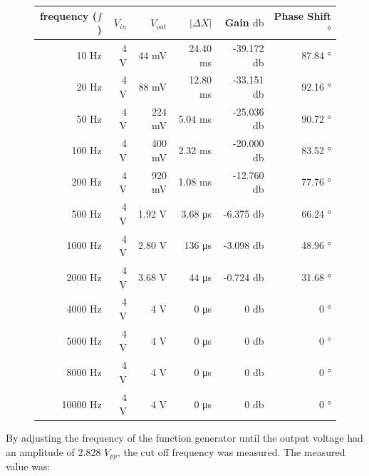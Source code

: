 \documentclass{article}
\begin{document}
\begin{figure}[H]
\centering
\begin{tabular}{ | r | r | r | r | r | r | }
	\hline
	frequency ($f$) & $V_{in}$ & $V_{out}$ & $|\Delta X|$ & Gain $\si{\decibel}$ & Phase Shift $\si{\degree}$ \\ \hline
	10 \si{\hertz} & 4 \si{\volt} & 44 \si{\milli\volt} & 24.40 \si{\milli\second} & -39.172 \si{\decibel} & 87.84 \si{\degree}\\ \hline
	20 \si{\hertz} & 4 \si{\volt} & 88 \si{\milli\volt} & 12.80 \si{\milli\second} & -33.151 \si{\decibel} & 92.16 \si{\degree}\\ \hline
	50 \si{\hertz} & 4 \si{\volt} & 224 \si{\milli\volt} & 5.04 \si{\milli\second} & -25.036 \si{\decibel} & 90.72 \si{\degree}\\ \hline
	100 \si{\hertz} & 4 \si{\volt} & 400 \si{\milli\volt} & 2.32 \si{\milli\second} & -20.000 \si{\decibel} & 83.52 \si{\degree}\\ \hline
	200 \si{\hertz} & 4 \si{\volt} & 920 \si{\milli\volt} & 1.08 \si{\milli\second} & -12.760 \si{\decibel} & 77.76 \si{\degree}\\ \hline
	500 \si{\hertz} & 4 \si{\volt} & 1.92 \si{\volt} & 3.68 \si{\micro\second} & -6.375 \si{\decibel} & 66.24 \si{\degree}\\ \hline
	1000 \si{\hertz} & 4 \si{\volt} & 2.80 \si{\volt} & 136 \si{\micro\second} & -3.098 \si{\decibel} & 48.96 \si{\degree}\\ \hline
	2000 \si{\hertz} & 4 \si{\volt} & 3.68 \si{\volt} & 44 \si{\micro\second} & -0.724 \si{\decibel} & 31.68 \si{\degree}\\ \hline
	4000 \si{\hertz} & 4 \si{\volt} & 4 \si{\volt} & 0 \si{\micro\second} & 0 \si{\decibel} & 0 \si{\degree}\\ \hline
	5000 \si{\hertz} & 4 \si{\volt} & 4 \si{\volt} & 0 \si{\micro\second} & 0 \si{\decibel} & 0 \si{\degree}\\ \hline
	8000 \si{\hertz} & 4 \si{\volt} & 4 \si{\volt} & 0 \si{\micro\second} & 0 \si{\decibel} & 0 \si{\degree}\\ \hline
	10000 \si{\hertz} & 4 \si{\volt} & 4 \si{\volt} & 0 \si{\micro\second} & 0 \si{\decibel} & 0 \si{\degree}\\ \hline
\end{tabular}
\end{figure}

By adjusting the frequency of the function generator until the output voltage had an amplitude of 2.828 $\si{V_{pp}}$, the cut off frequency was measured. The measured value was:
\end{document}
